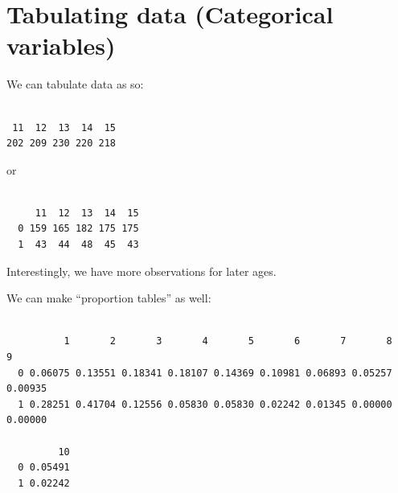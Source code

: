 \documentclass[
  letterpaper,
  DIV=11,
  numbers=noendperiod]{scrreprt}
\newenvironment{Shaded}{\begin{snugshade}}{\end{snugshade}}
\newcommand{\AttributeTok}[1]{\textcolor[rgb]{0.49,0.56,0.16}{#1}}
\newcommand{\DecValTok}[1]{\textcolor[rgb]{0.25,0.63,0.44}{#1}}
\newcommand{\FunctionTok}[1]{\textcolor[rgb]{0.02,0.16,0.49}{#1}}
\newcommand{\NormalTok}[1]{\textcolor[rgb]{0.00,0.44,0.13}{#1}}
\newcommand{\SpecialCharTok}[1]{\textcolor[rgb]{0.25,0.44,0.63}{#1}}
\begin{document}
\hypertarget{tabulating-data-categorical-variables}{%
\section{Tabulating data (Categorical
variables)}\label{tabulating-data-categorical-variables}}

We can tabulate data as so:

\begin{Shaded}
\end{Shaded}

\begin{verbatim}

 11  12  13  14  15 
202 209 230 220 218 
\end{verbatim}

or

\begin{Shaded}
\end{Shaded}

\begin{verbatim}
   
     11  12  13  14  15
  0 159 165 182 175 175
  1  43  44  48  45  43
\end{verbatim}

Interestingly, we have more observations for later ages.

We can make ``proportion tables'' as well:

\begin{Shaded}
\end{Shaded}

\begin{verbatim}
   
          1       2       3       4       5       6       7       8       9
  0 0.06075 0.13551 0.18341 0.18107 0.14369 0.10981 0.06893 0.05257 0.00935
  1 0.28251 0.41704 0.12556 0.05830 0.05830 0.02242 0.01345 0.00000 0.00000
   
         10
  0 0.05491
  1 0.02242
\end{verbatim}
\end{document}
